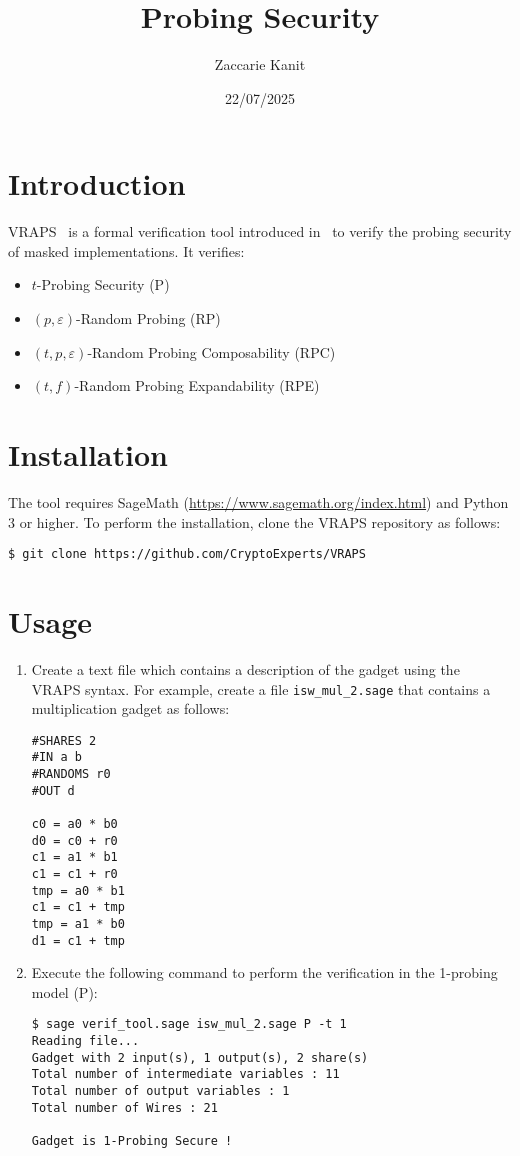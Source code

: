 \documentclass{article}
\author{Zaccarie Kanit}
\date{22/07/2025}
\title{Probing Security}
\begin{document}
\maketitle

\section{Introduction}

VRAPS~\cite{vraps} is a formal verification tool introduced in~\cite{DBLP:conf/crypto/BelaidCPRT20} to verify the probing security of masked implementations. It verifies:

\begin{itemize}
\item $t$-Probing Security (P)
\item $(p, \varepsilon)$-Random Probing (RP)
\item $(t, p, \varepsilon)$-Random Probing Composability (RPC)
\item $(t, f)$-Random Probing Expandability (RPE)
\end{itemize}

\section{Installation}

The tool requires SageMath (\url{https://www.sagemath.org/index.html}) and Python 3 or higher. To perform the installation, clone the VRAPS repository as follows:

\begin{verbatim}
$ git clone https://github.com/CryptoExperts/VRAPS
\end{verbatim}

\section{Usage}\label{sec:usage}
\begin{enumerate}
\item Create a text file which contains a description of the gadget using the VRAPS syntax. For example, create a file \texttt{isw\_mul\_2.sage} that contains a multiplication gadget as follows:  
\begin{verbatim}
#SHARES 2
#IN a b
#RANDOMS r0
#OUT d

c0 = a0 * b0	
d0 = c0 + r0
c1 = a1 * b1
c1 = c1 + r0
tmp = a0 * b1
c1 = c1 + tmp
tmp = a1 * b0
d1 = c1 + tmp
\end{verbatim}
\item Execute the following command to perform the verification in the 1-probing model (P):
\begin{verbatim}
$ sage verif_tool.sage isw_mul_2.sage P -t 1
Reading file...
Gadget with 2 input(s), 1 output(s), 2 share(s)
Total number of intermediate variables : 11
Total number of output variables : 1
Total number of Wires : 21

Gadget is 1-Probing Secure !
\end{verbatim}
\end{enumerate}
\end{document}
